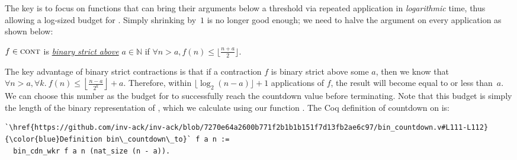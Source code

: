 The key is to focus on functions that can bring their arguments below a threshold via repeated application in
\emph{logarithmic} time, thus allowing a log-sized budget for
. Simply shrinking by~$1$ is no longer good enough;
we need to halve the argument on every application as shown below:
\begin{defn} \label{defn: bin-contraction}
	$f\in \text{\scshape{cont}}$ is
	\href{https://github.com/inv-ack/inv-ack/blob/7270e64a2600b771f2b1b1b151f7d13fb2ae6c97/bin_countdown.v#L37-L41}{\color{blue}\emph{binary strict above}}
	$a\in \mathbb{N}$ if $\forall n > a, f(n) \le \lfloor \frac{n + a}{2} \rfloor$.
\end{defn}
\noindent The key advantage of binary strict contractions is that if a contraction $f$ is binary strict above some $a$, then \lb
we know that $\forall n > a, \forall k.~f(n) \le \left\lfloor \frac{n - a}{2^k} \right\rfloor + a$.
Therefore, within $\lfloor \log_2 (n - a) \rfloor + 1$ applications of $f$, the result will become equal to or less than~$a$. We can choose this number as the budget for  to successfully reach the countdown value before terminating.
Note that this budget is simply the length of the binary representation
of , which we calculate using our function
\href{https://github.com/inv-ack/inv-ack/blob/7270e64a2600b771f2b1b1b151f7d13fb2ae6c97/bin_prelims.v#L135-L143}{\color{blue}}. %
The Coq definition of countdown on  is:
\begin{lstlisting}
`\href{https://github.com/inv-ack/inv-ack/blob/7270e64a2600b771f2b1b1b151f7d13fb2ae6c97/bin_countdown.v#L111-L112}{\color{blue}Definition bin\_countdown\_to}` f a n :=
  bin_cdn_wkr f a n (nat_size (n - a)).
\end{lstlisting}

